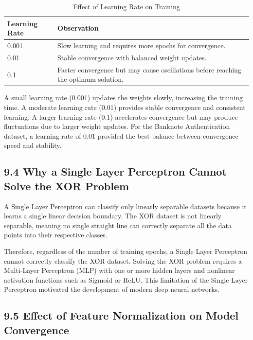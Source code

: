\documentclass[11pt]{article}
\begin{document}
\begin{table}[H]
\centering
\caption{Effect of Learning Rate on Training}
\label{tab:learning_rates}
\begin{tabular}{|p{3cm}|p{9cm}|}
\hline
\textbf{Learning Rate} & \textbf{Observation} \\
\hline
0.001 & Slow learning and requires more epochs for convergence. \\
\hline
0.01 & Stable convergence with balanced weight updates. \\
\hline
0.1 & Faster convergence but may cause oscillations before reaching the optimum solution. \\
\hline
\end{tabular}
\end{table}

A small learning rate (0.001) updates the weights slowly, increasing the training time. A moderate learning rate (0.01) provides stable convergence and consistent learning. A larger learning rate (0.1) accelerates convergence but may produce fluctuations due to larger weight updates. For the Banknote Authentication dataset, a learning rate of 0.01 provided the best balance between convergence speed and stability.

\subsection*{9.4 Why a Single Layer Perceptron Cannot Solve the XOR Problem}


A Single Layer Perceptron can classify only linearly separable datasets because it learns a single linear decision boundary. The XOR dataset is not linearly separable, meaning no single straight line can correctly separate all the data points into their respective classes.

Therefore, regardless of the number of training epochs, a Single Layer Perceptron cannot correctly classify the XOR dataset. Solving the XOR problem requires a Multi-Layer Perceptron (MLP) with one or more hidden layers and nonlinear activation functions such as Sigmoid or ReLU. This limitation of the Single Layer Perceptron motivated the development of modern deep neural networks.

\subsection*{9.5 Effect of Feature Normalization on Model Convergence}
\end{document}
